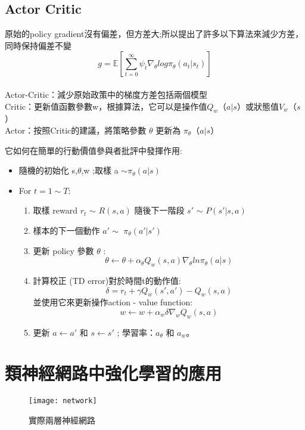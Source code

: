 \subsection{Actor Critic}
原始的policy gradient沒有偏差，但方差大;所以提出了許多以下算法來減少方差，同時保持偏差不變\\[5pt]
$$g = \mathbb{E}[\sum_{t=0}^\infty\psi_t\nabla_\theta log\pi_\theta(a_t \vert s_t)]$$\\[5pt]
Actor-Critic：減少原始政策中的梯度方差包括兩個模型\\[5pt]
Critic：更新值函數參數w，根據算法，它可以是操作值$ Q_w$（$a \vert s$）或狀態值$V_w$（$s$） \\[5pt]
Actor：按照Critic的建議，將策略參數 $\theta$ 更新為 $\pi_\theta$（$a \vert s$）\\[5pt]
\begin{Large}
它如何在簡單的行動價值參與者批評中發揮作用:
\end{Large}
\begin{itemize}
\item 隨機的初始化 s,$\theta$,w ;取樣 a $\sim
\pi_\theta(a \vert s)$
\end{itemize}
\begin{itemize}
\item For $t =1 \sim T:$ 
\begin{enumerate}[1]
\item 取樣 reward $r_t$ $\sim$ $R(s,a)$ 隨後下一階段 $s'$ $\sim$ $P(s'\vert s,a)$ 
\item 樣本的下一個動作 $a' \sim$ $\pi_\theta(a'\vert s')$
\item 更新 policy 參數 $\theta$ :\\
$$\theta\leftarrow\theta+\alpha_\theta Q_w(s,a)\nabla_\theta ln\pi_\theta(a\vert s)$$
\item 計算校正 (TD error)對於時間t的動作值:\\
$$\delta = r_t + \gamma Q_w(s',a')-Q_w(s,a)$$
並使用它來更新操作action - value function:\\
$$w\leftarrow w+\alpha_w \delta \nabla_w Q_w(s,a) $$
\item 更新 $a\leftarrow a'$ 和 $ s \leftarrow s'$ ; 學習率：$a_\theta$ 和 $a_w$。
\end{enumerate}   
\end{itemize}\newpage
\section{類神經網路中強化學習的應用}
\begin{figure}[hbt!]
\begin{center}
\texttt{[image:  network]}
\caption{實際兩層神經網路}
\end{center}
\end{figure}

